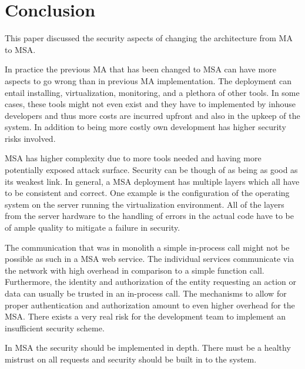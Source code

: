 \section{Conclusion}
\begin{sloppypar}
    This paper discussed the security aspects of changing the architecture from
    MA to MSA. 
\end{sloppypar}
\begin{sloppypar}
    In practice the previous MA that has been changed to MSA can have more
    aspects to go wrong than in previous MA implementation. The deployment can
    entail installing, virtualization, monitoring, and a plethora of other
    tools. In some cases, these tools might not even exist and they have to
    implemented by inhouse developers and thus more costs are incurred upfront
    and also in the upkeep of the system. In addition to being more costly own
    development has higher security risks involved.
\end{sloppypar}
\begin{sloppypar}
    MSA has higher complexity due to more tools needed and having more
    potentially exposed attack surface. Security can be though of as being as
    good as its weakest link. In general, a MSA deployment has multiple layers
    which all have to be consistent and correct. One example is the
    configuration of the operating system on the server running the
    virtualization environment. All of the layers from the server hardware to
    the handling of errors in the actual code have to be of ample quality to
    mitigate a failure in security.
\end{sloppypar}
\begin{sloppypar}
    The communication that was in monolith a simple in-process call might not be
    possible as such in a MSA web service. The individual services communicate
    via the network with high overhead in comparison to a simple function call.
    Furthermore, the identity and authorization of the entity requesting an
    action or data can usually be trusted in an in-process call. The mechanisms
    to allow for proper authentication and authorization amount to even higher
    overhead for the MSA. There exists a very real risk for the development team
    to implement an insufficient security scheme.
\end{sloppypar}
\begin{sloppypar}
    In MSA the security should be implemented in depth. There must be a healthy
    mistrust on all requests and security should be built in to the system.
\end{sloppypar}

